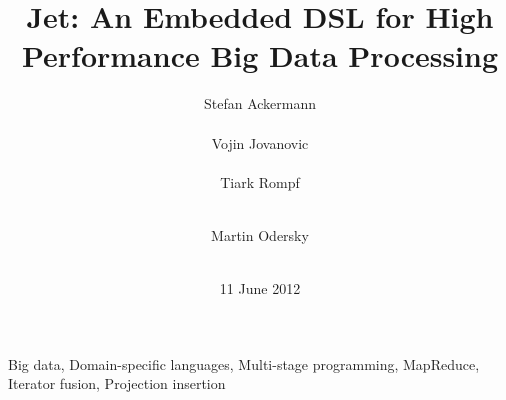 \documentclass{acm_proc_article-sp}
\newcommand{\tool}{Jet\xspace}
\begin{document}

    
  \title{\tool: An Embedded DSL for High Performance Big Data Processing}


  \author{
	\alignauthor
	Stefan Ackermann\\
	 \\
        \alignauthor
        Vojin Jovanovic\\
        \\
        \alignauthor
        Tiark Rompf\\
        \\
\and
       \alignauthor
        Martin Odersky\\
        \\
  }
  
  
  
  
  \date{11 June 2012}
  \maketitle
  
  \begin{abstract}
    
  \end{abstract}
  
  \keywords Big data, Domain-specific languages, Multi-stage programming, MapReduce, Iterator fusion, Projection insertion


  
  
  
  
  
  
  
  
  
  

  
  
  
  
\end{document}
